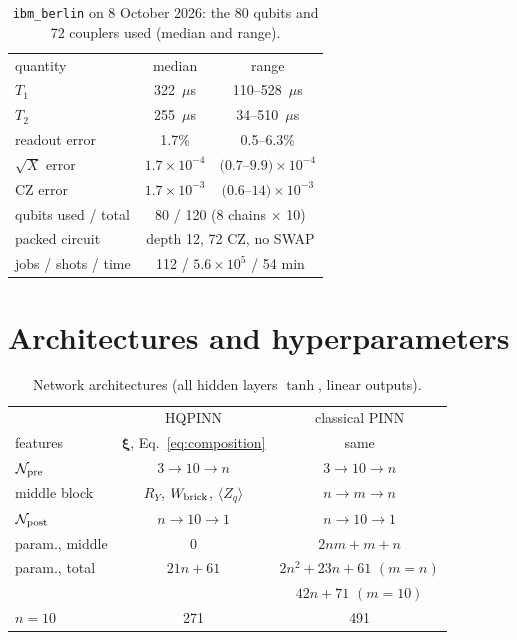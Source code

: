 \documentclass[floatfix,aps,pra,twocolumn,superscriptaddress,10pt,nofootinbib]{revtex4-2}
\begin{document}
\begin{appendices}
\begin{table}[b]
\caption{\justifying \texttt{ibm\_berlin} on 8 October 2026: the 80 qubits and 72 couplers used (median and range).}
\label{tab:device}
\setlength{\tabcolsep}{4pt}
\footnotesize
\begin{ruledtabular}
\begin{tabular}{lcc}
quantity & median & range\\
\colrule
$T_1$ & 322~$\mu$s & 110--528~$\mu$s\\
$T_2$ & 255~$\mu$s & 34--510~$\mu$s\\
readout error & 1.7\% & 0.5--6.3\%\\
$\sqrt X$ error & $1.7\times10^{-4}$ & $(0.7$--$9.9)\times10^{-4}$\\
CZ error & $1.7\times10^{-3}$ & $(0.6$--$14)\times10^{-3}$\\
\colrule
qubits used / total & \multicolumn{2}{c}{80 / 120 (8 chains $\times$ 10)}\\
packed circuit & \multicolumn{2}{c}{depth 12, 72 CZ, no SWAP}\\
jobs / shots / time & \multicolumn{2}{c}{112 / $5.6\times10^5$ / 54 min}\\
\end{tabular}
\end{ruledtabular}
\end{table}

\section{Architectures and hyperparameters}\label{app:hyper}

\begin{table}[h]
\caption{\justifying Network architectures (all hidden layers $\tanh$, linear outputs).}
\label{tab:arch}
\setlength{\tabcolsep}{2pt}
\footnotesize
\begin{ruledtabular}
\begin{tabular}{lcc}
 & HQPINN & classical PINN\\
\colrule
features & $\bm\xi$, Eq.~\eqref{eq:composition} & same\\
$\mathcal N_{\rm pre}$ & $3\to10\to n$ & $3\to10\to n$\\
middle block & $R_Y$, $W_{\rm brick}$, $\langle Z_q\rangle$ & $n\to m\to n$\\
$\mathcal N_{\rm post}$ & $n\to10\to1$ & $n\to10\to1$\\
param., middle & 0 & $2nm+m+n$\\
param., total & $21n+61$ & $2n^2+23n+61$ $(m{=}n)$\\
 & & $42n+71$ $(m{=}10)$\\
$n=10$ & 271 & 491\\
\end{tabular}
\end{ruledtabular}
\end{table}


\end{appendices}
\end{document}
